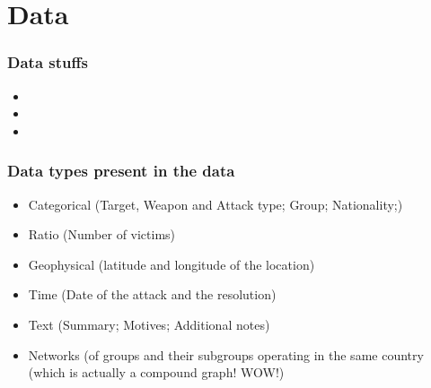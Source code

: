 
\section{Data}

  \begin{frame}
    \frametitle{Data stuffs}

    \begin{itemize}
      \item {}
      \item {}
      \item {}
    \end{itemize}

  \end{frame}



  \begin{frame}
    \frametitle{Data types present in the data}

    \begin{itemize}
        \item Categorical (Target, Weapon and Attack type; Group; Nationality;)
        \item Ratio (Number of victims)
        \item Geophysical (latitude and longitude of the location)
        \item Time (Date of the attack and the resolution)
        \item Text (Summary; Motives; Additional notes)
        \item Networks (of groups and their subgroups operating in the same country (which is actually a compound graph! WOW!)
    \end{itemize}

  \end{frame}


